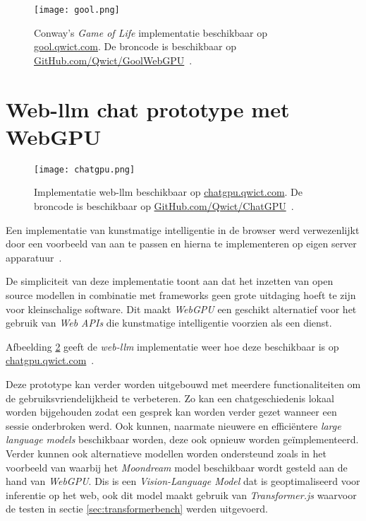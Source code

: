 \begin{figure}
    \texttt{[image: gool.png]}
    \caption[Conway's \textit{Game of Life} implementatie~\autocite{Qwict2024}]{
        Conway's \textit{Game of Life} implementatie beschikbaar op \href{https://gool.qwict.com}{gool.qwict.com}. De broncode is beschikbaar op \href{https://github.com/qwict/GoolWebGPU}{GitHub.com/Qwict/GoolWebGPU}~\autocite{google2023, Qwict2024}.
    }
    \label{fig:Conway's Game of Life}
\end{figure}

\break{}

\section{Web-llm chat prototype met WebGPU}
\label{sec:chatgpu}
\begin{figure}
    \texttt{[image: chatgpu.png]}
    \caption[Implementatie web-llm~\autocite{mlcai2023, Qwict2024a}]{
        Implementatie web-llm beschikbaar op \href{https://chatgpu.qwict.com}{chatgpu.qwict.com}. De broncode is beschikbaar op \href{https://github.com/qwict/chatgpu}{GitHub.com/Qwict/ChatGPU}~\autocite{mlcai2023, Qwict2024a}.
    }
    \label{fig:Implementatie web-llm}
\end{figure}

Een implementatie van kunstmatige intelligentie in de browser werd verwezenlijkt door een voorbeeld van \textcite{mlcai2023} aan te passen en hierna te implementeren op eigen server apparatuur~\autocite{Qwict2024a}.

\bigbreak{}

De simpliciteit van deze implementatie toont aan dat het inzetten van open source modellen in combinatie met frameworks geen grote uitdaging hoeft te zijn voor kleinschalige software. Dit maakt \textit{WebGPU} een geschikt alternatief voor het gebruik van \textit{Web APIs} die kunstmatige intelligentie voorzien als een dienst.

\bigbreak{}

Afbeelding \ref{fig:Implementatie web-llm} geeft de \textit{web-llm} implementatie weer hoe deze beschikbaar is op \href{https://chatgpu.qwict.com}{chatgpu.qwict.com}~\autocite{Qwict2024a}.

\bigbreak{}

Deze prototype kan verder worden uitgebouwd met meerdere functionaliteiten om de gebruiksvriendelijkheid te verbeteren. Zo kan een chatgeschiedenis lokaal worden bijgehouden zodat een gesprek kan worden verder gezet wanneer een sessie onderbroken werd. Ook kunnen, naarmate nieuwere en efficiëntere \textit{large language models} beschikbaar worden, deze ook opnieuw worden geïmplementeerd. Verder kunnen ook alternatieve modellen worden ondersteund zoals in het voorbeeld van \textcite{Lochner2024b} waarbij het \textit{Moondream} model beschikbaar wordt gesteld aan de hand van \textit{WebGPU}. Dis is een \textit{Vision-Language Model} dat is geoptimaliseerd voor inferentie op het web, ook dit model maakt gebruik van \textit{Transformer.js} waarvoor de testen in sectie \ref{sec:transformerbench} werden uitgevoerd.

